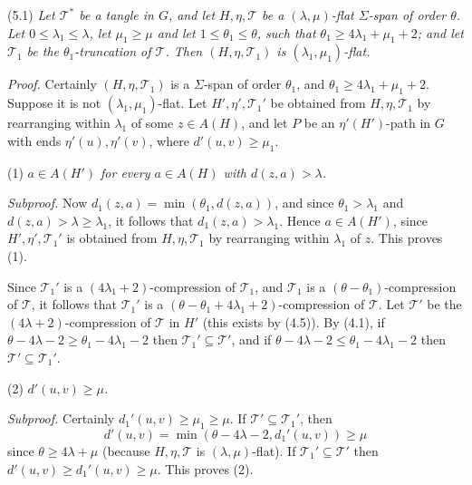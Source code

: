 \stmt
(5.1) \textit{Let $\mathscr{T}^*$ be a tangle in $G$, and let $H, \eta, \mathscr{T}$ be a $(\lambda, \mu)$-flat $\Sigma$-span of order $\theta$. Let $0 \le \lambda_1 \le \lambda$, let $\mu_1 \ge \mu$ and let $1 \le \theta_1 \le \theta$, such that $\theta_1 \ge 4\lambda_1 + \mu_1 + 2$; and let $\mathscr{T}_1$ be the $\theta_1$-truncation of $\mathscr{T}$. Then $(H, \eta, \mathscr{T}_1)$ is $(\lambda_1, \mu_1)$-flat.}

\textit{Proof.} Certainly $(H, \eta, \mathscr{T}_1)$ is a $\Sigma$-span of order $\theta_1$, and $\theta_1 \ge 4\lambda_1 + \mu_1 + 2$. Suppose it is not $(\lambda_1, \mu_1)$-flat. Let $H', \eta', \mathscr{T}_1'$ be obtained from $H, \eta, \mathscr{T}_1$ by rearranging within $\lambda_1$ of some $z \in A(H)$, and let $P$ be an $\eta'(H')$-path in $G$ with ends $\eta'(u), \eta'(v)$, where $d'(u, v) \ge \mu_1$.

\hspace*{12pt}(1) \textit{$a \in A(H')$ for every $a \in A(H)$ with $d(z, a) > \lambda$.}

\textit{Subproof.} Now $d_1(z, a) = \min(\theta_1, d(z, a))$, and since $\theta_1 > \lambda_1$ and $d(z, a) > \lambda \ge \lambda_1$, it follows that $d_1(z, a) > \lambda_1$. Hence $a \in A(H')$, since $H', \eta', \mathscr{T}_1'$ is obtained from $H, \eta, \mathscr{T}_1$ by rearranging within $\lambda_1$ of $z$. This proves (1).

Since $\mathscr{T}_1'$ is a $(4\lambda_1 + 2)$-compression of $\mathscr{T}_1$, and $\mathscr{T}_1$ is a $(\theta - \theta_1)$-compression of $\mathscr{T}$, it follows that $\mathscr{T}_1'$ is a $(\theta - \theta_1 + 4\lambda_1 + 2)$-compression of $\mathscr{T}$. Let $\mathscr{T}'$ be the $(4\lambda + 2)$-compression of $\mathscr{T}$ in $H'$ (this exists by (4.5)). By (4.1), if $\theta - 4\lambda - 2 \ge \theta_1 - 4\lambda_1 - 2$ then $\mathscr{T}_1' \subseteq \mathscr{T}'$, and if $\theta - 4\lambda - 2 \le \theta_1 - 4\lambda_1 - 2$ then $\mathscr{T}' \subseteq \mathscr{T}_1'$.

\hspace*{12pt}(2) \textit{$d'(u, v) \ge \mu$.}

\textit{Subproof.} Certainly $d_1'(u, v) \ge \mu_1 \ge \mu$. If $\mathscr{T}' \subseteq \mathscr{T}_1'$, then
\begin{equation*}
d'(u, v) = \min(\theta - 4\lambda - 2, d_1'(u, v)) \ge \mu
\end{equation*}
since $\theta \ge 4\lambda + \mu$ (because $H, \eta, \mathscr{T}$ is $(\lambda, \mu)$-flat). If $\mathscr{T}_1' \subseteq \mathscr{T}'$ then $d'(u, v) \ge d_1'(u, v) \ge \mu$. This proves (2).

